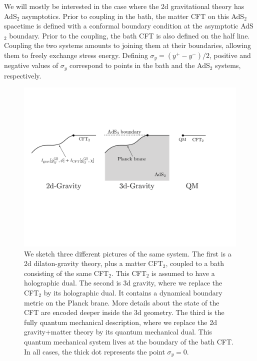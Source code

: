 \documentclass[11pt]{article}
\begin{document}
We will mostly be interested in the case where the 2d gravitational theory has AdS$_2$ asymptotics.
Prior to coupling in the bath, the matter CFT on this AdS$_2$ spacetime is defined with a conformal boundary condition at the asymptotic AdS$_2$ boundary. 
Prior to the coupling, the bath CFT is also defined on the half line. 
Coupling the two systems amounts to joining them at their boundaries, allowing them to freely exchange stress energy. 
Defining $\sigma_y = (y^+ - y^-)/2$, positive and negative values of $\sigma_y$ correspond to points in the bath and the AdS$_2$ systems, respectively. 
\begin{figure}[t]
    \begin{center}
    \includegraphics[scale=.48]{Figures/ThreePictures}
    \end{center}
    \caption{We sketch three different pictures of the same system.
    The first is a 2d dilaton-gravity theory, plus a matter CFT$_2$, coupled to a bath consisting of the same CFT$_2$. 
    This CFT$_2$ is assumed to have a holographic dual.
    The second is 3d gravity, where we replace the CFT$_2$ by its holographic dual.
    It contains a dynamical boundary metric on the Planck brane.  
    More details about the state of the CFT are encoded deeper inside the 3d geometry.
    The third is the fully quantum mechanical description, where we replace the 2d gravity+matter theory by its quantum mechanical dual. This quantum mechanical system lives at the boundary of the bath CFT.
    In all cases, the thick dot represents the point $\sigma_y=0$.}
    \label{ThreePictures}
\end{figure}
\end{document}
